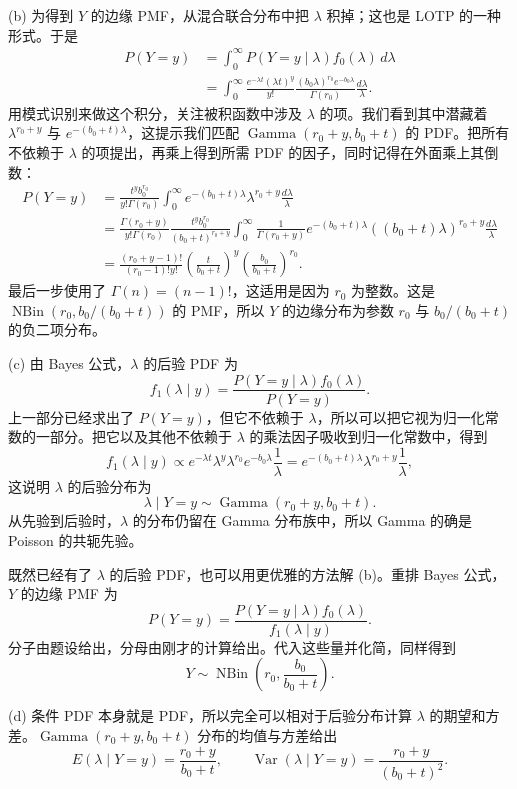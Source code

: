 \documentclass[UTF8, 12pt, fontset=fandol, oneside]{ctexart}
\begin{document}
(b) 为得到 $Y$ 的边缘 PMF，从混合联合分布中把 $\lambda$ 积掉；这也是 LOTP 的一种形式。于是
\[
\begin{aligned}
  P(Y=y)
  &=\int_0^\infty P(Y=y\mid\lambda)f_0(\lambda)\,d\lambda\\
  &=\int_0^\infty
    \frac{e^{-\lambda t}(\lambda t)^y}{y!}
    \frac{(b_0\lambda)^{r_0}e^{-b_0\lambda}}{\Gamma(r_0)}
    \frac{d\lambda}{\lambda}.
\end{aligned}
\]
用模式识别来做这个积分，关注被积函数中涉及 $\lambda$ 的项。我们看到其中潜藏着 $\lambda^{r_0+y}$ 与 $e^{-(b_0+t)\lambda}$，这提示我们匹配 $\operatorname{Gamma}(r_0+y,b_0+t)$ 的 PDF。把所有不依赖于 $\lambda$ 的项提出，再乘上得到所需 PDF 的因子，同时记得在外面乘上其倒数：
\[
\begin{aligned}
  P(Y=y)
  &=
  \frac{t^y b_0^{r_0}}{y!\Gamma(r_0)}
  \int_0^\infty e^{-(b_0+t)\lambda}\lambda^{r_0+y}\frac{d\lambda}{\lambda}\\
  &=
  \frac{\Gamma(r_0+y)}{y!\Gamma(r_0)}
  \frac{t^y b_0^{r_0}}{(b_0+t)^{r_0+y}}
  \int_0^\infty
  \frac{1}{\Gamma(r_0+y)}
  e^{-(b_0+t)\lambda}((b_0+t)\lambda)^{r_0+y}
  \frac{d\lambda}{\lambda}\\
  &=
  \frac{(r_0+y-1)!}{(r_0-1)!y!}
  \left(\frac{t}{b_0+t}\right)^y
  \left(\frac{b_0}{b_0+t}\right)^{r_0}.
\end{aligned}
\]
最后一步使用了 $\Gamma(n)=(n-1)!$，这适用是因为 $r_0$ 为整数。这是 $\operatorname{NBin}(r_0,b_0/(b_0+t))$ 的 PMF，所以 $Y$ 的边缘分布为参数 $r_0$ 与 $b_0/(b_0+t)$ 的负二项分布。

(c) 由 Bayes 公式，$\lambda$ 的后验 PDF 为
\[
  f_1(\lambda\mid y)
  =
  \frac{P(Y=y\mid \lambda)f_0(\lambda)}{P(Y=y)}.
\]
上一部分已经求出了 $P(Y=y)$，但它不依赖于 $\lambda$，所以可以把它视为归一化常数的一部分。把它以及其他不依赖于 $\lambda$ 的乘法因子吸收到归一化常数中，得到
\[
  f_1(\lambda\mid y)
  \propto e^{-\lambda t}\lambda^y\lambda^{r_0}e^{-b_0\lambda}\frac1\lambda
  =
  e^{-(b_0+t)\lambda}\lambda^{r_0+y}\frac1\lambda,
\]
这说明 $\lambda$ 的后验分布为
\[
  \lambda\mid Y=y\sim\operatorname{Gamma}(r_0+y,b_0+t).
\]
从先验到后验时，$\lambda$ 的分布仍留在 Gamma 分布族中，所以 Gamma 的确是 Poisson 的共轭先验。

既然已经有了 $\lambda$ 的后验 PDF，也可以用更优雅的方法解 (b)。重排 Bayes 公式，$Y$ 的边缘 PMF 为
\[
  P(Y=y)=\frac{P(Y=y\mid \lambda)f_0(\lambda)}{f_1(\lambda\mid y)}.
\]
分子由题设给出，分母由刚才的计算给出。代入这些量并化简，同样得到
\[
  Y\sim\operatorname{NBin}\left(r_0,\frac{b_0}{b_0+t}\right).
\]

(d) 条件 PDF 本身就是 PDF，所以完全可以相对于后验分布计算 $\lambda$ 的期望和方差。$\operatorname{Gamma}(r_0+y,b_0+t)$ 分布的均值与方差给出
\[
  E(\lambda\mid Y=y)=\frac{r_0+y}{b_0+t},
  \qquad
  \operatorname{Var}(\lambda\mid Y=y)=\frac{r_0+y}{(b_0+t)^2}.
\]
\end{document}
